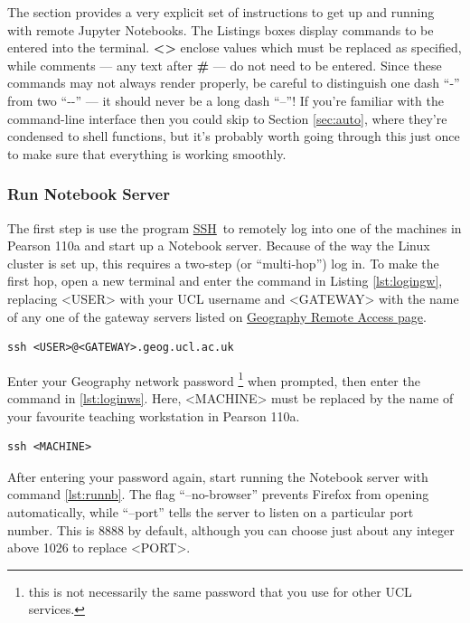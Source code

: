 \documentclass[a4paper]{article}
\begin{document}
The section provides a very explicit set of instructions to get up and running with remote Jupyter Notebooks.
The Listings boxes display commands to be entered into the terminal. \textbf{\textless{}\textgreater{}} enclose values which must be replaced as specified, while comments --- any text after \textbf{\#} --- do not need to be entered.
Since these commands may not always render properly, be careful to distinguish one dash ``-'' from two ``-{}-'' --- it should never be a long dash ``--''!
If you're familiar with the command-line interface then you could skip to Section \ref{sec:auto}, where they're condensed to shell functions, but it's probably worth going through this just once to make sure that everything is working smoothly.

\subsubsection{Run Notebook Server}
\label{sec:runnb}

The first step is use the program \href{http://linuxcommand.org/man_pages/ssh1.html}{SSH}~to remotely log into one of the machines in Pearson 110a and start up a Notebook server.
Because of the way the Linux cluster is set up, this requires a two-step (or ``multi-hop'') log in.
To make the first hop, open a new terminal and enter the command in Listing \ref{lst:logingw}, replacing \textless{}USER\textgreater{} with your UCL username and \textless{}GATEWAY\textgreater{} with the name of any one of the gateway servers listed on \href{http://www.geog.ucl.ac.uk/resources/computer-support/linux-remote-access}{Geography Remote Access page}.

\begin{lstlisting}[caption={Login to gateway}, label={lst:logingw}]
ssh <USER>@<GATEWAY>.geog.ucl.ac.uk
\end{lstlisting}

Enter your Geography network password \footnote{this is not necessarily the same password that you use for other UCL services.} when prompted, then enter the command in \ref{lst:loginws}.
Here, \textless{}MACHINE\textgreater{} must be replaced by the name of your favourite teaching workstation in Pearson 110a.

\begin{lstlisting}[caption={Login to workstation}, label={lst:loginws}]
ssh <MACHINE>
\end{lstlisting}

After entering your password again, start running the Notebook server with command \ref{lst:runnb}.
The flag ``--no-browser'' prevents Firefox from opening automatically, while ``--port'' tells the server to listen on a particular port number.
This is 8888 by default, although you can choose just about any integer above 1026 to replace \textless{}PORT\textgreater{}.
\end{document}
